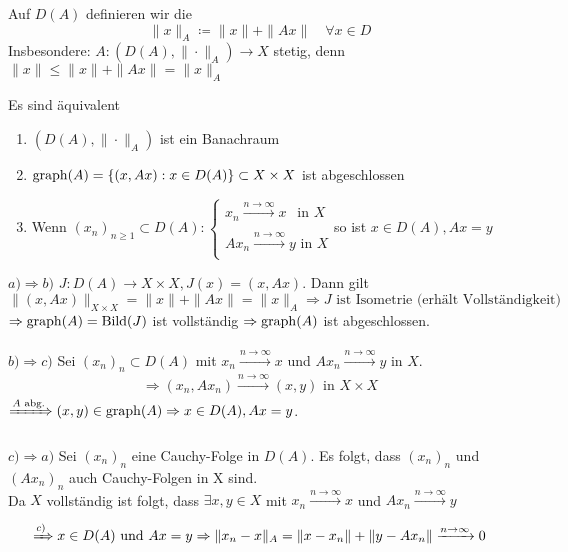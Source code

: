 \begin{definition}
	Auf $D(A)$ definieren wir die 
	\[ \| x \|_{A} \coloneqq \|x \| + \| A x \| \quad \forall x \in D \]
	Insbesondere: $A: (D(A), \| \cdot \|_{A}) \rightarrow X$ stetig, denn $\| x \| \leq \|x \| + \| A x \| = \| x \|_{A}$
\end{definition}


\begin{satz} \label{satz:12.3}
	Es sind äquivalent
	\begin{enumerate}[label=\alph*\upshape)]
		\item $\left( D(A), \| \cdot \|_{A} \right)$ ist ein Banachraum
		\item $\operatorname{graph}(A) = \{ (x, A x): x \in D(A) \} \subset X \times X$ ist abgeschlossen
		\item Wenn $(x_{n})_{n \geq 1} \subset D(A): \begin{cases}
			x_{n} \xrightarrow[]{n \rightarrow \infty} x ~~\text{ in } X \\ A x_{n} \xrightarrow[]{n \rightarrow \infty} y \text{ in } X\end{cases}$so ist $x \in D(A), A x = y$
	\end{enumerate}
\end{satz}

\begin{beweis}
	$a) \Rightarrow b)$ $J: D(A) \rightarrow X \times X, J(x) = (x, Ax)$. Dann gilt
		\[ \| (x, Ax) \|_{X \times X} = \| x \| + \| A x \| = \| x \|_{A} \Rightarrow J \text{ ist Isometrie (erhält Vollständigkeit)}  \]
		$\Rightarrow \operatorname{graph}(A) = \mathop{\rm Bild}\nolimits(J)$ ist vollständig $\Rightarrow \operatorname{graph}(A)$ ist abgeschlossen. \\ \\
	$b) \Rightarrow c)$ Sei $(x_{n})_{n} \subset D(A)$ mit $x_{n} \xrightarrow[]{n \rightarrow \infty} x$ und $Ax_{n} \xrightarrow[]{n \rightarrow \infty} y$ in $X$.
		\[ \Rightarrow (x_{n}, A x_{n}) \xrightarrow[]{n \rightarrow \infty} (x, y) \text{ in } X \times X \]
		$\xRightarrow[]{A \text{ abg.}} (x, y) \in \operatorname{graph}(A) \Rightarrow x \in D(A), Ax = y$. \\ \\
	$c) \Rightarrow a)$ Sei $(x_{n})_{n}$ eine Cauchy-Folge in $D(A)$. Es folgt, dass $(x_{n})_{n}$ und $(A x_{n})_{n}$ auch Cauchy-Folgen in X sind. \\
	Da $X$ vollständig ist folgt, dass  $\exists x, y \in X$ mit $x_{n} \xrightarrow[]{n \rightarrow \infty} x$ und $A x_{n} \xrightarrow[]{n \rightarrow \infty} y$ \\
	\[ \xRightarrow[]{c)} x \in D(A) \text{ und } A x = y \Rightarrow \|x_{n} - x \|_{A} = \| x - x_{n} \| + \| y - A x_{n} \| \xrightarrow[]{n \rightarrow \infty} 0 \]
\end{beweis}


